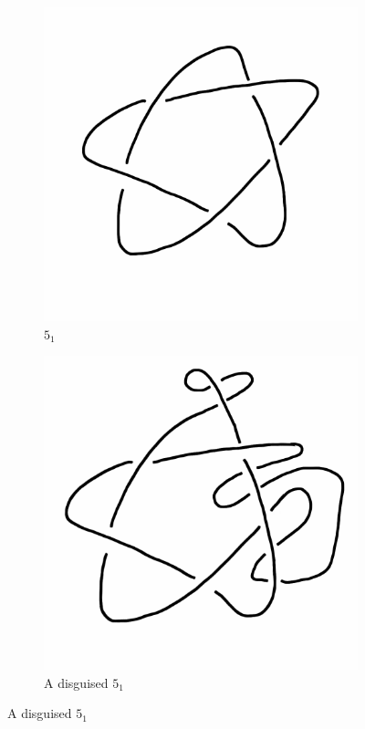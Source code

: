 \documentclass[12pt]{amsart}
\theoremstyle{definition}
\begin{document}
\begin{figure}[h]
        \centering
        \begin{subfigure}[b]{0.3\textwidth}
                \includegraphics[width=\textwidth]{knotpics/5-1-tj.png}
                \caption{$5_1$}
        \end{subfigure}
        \begin{subfigure}[b]{0.3\textwidth}
                \includegraphics[width=\textwidth]{knotpics/5-1-wiggled.png}
                \caption{A disguised $5_1$}
        \end{subfigure}
\end{figure}
\end{document}
